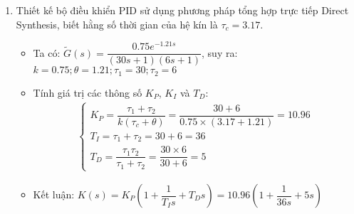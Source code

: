 \begin{solution}
\begin{enumerate}
\begin{enumerate}
            \item Thiết kế bộ điều khiển PID sử dụng phương pháp tổng hợp trực tiếp Direct Synthesis, biết hằng số thời gian của hệ kín là $\tau_c = 3.17$.
                \begin{itemize}
                    \item Ta có: $\tilde{G}(s) = \dfrac{0.75 e^{-1.21 s}}{\left({30s + 1}\right) \left({6s + 1}\right)}$, suy ra: $k = 0.75; \theta = 1.21; \tau_1 = 30; \tau_2 = 6$
                    \item Tính giá trị các thông số $K_P$, $K_I$ và $T_D$:
                        \begin{align*}
                            \left\{\begin{array}{l}
                                K_P = \dfrac{\tau_1 + \tau_2}{k\left({\tau_c + \theta}\right)} = \dfrac{30 + 6}{0.75 \times \left({3.17 + 1.21}\right)} = 10.96\\
                                T_I = \tau_1 + \tau_2 = 30 + 6 = 36\\
                                T_D = \dfrac{\tau_1 \tau_2}{\tau_1 + \tau_2} = \dfrac{30 \times 6}{30 + 6} = 5
                            \end{array}\right.
                        \end{align*}
                    \item Kết luận: $K(s) = K_P \left({1 + \dfrac{1}{T_I s} + T_D s}\right) = 10.96 \left({1 + \dfrac{1}{36s} + 5s}\right)$
                \end{itemize}
        \end{enumerate}
    \end{enumerate}
\end{solution}
